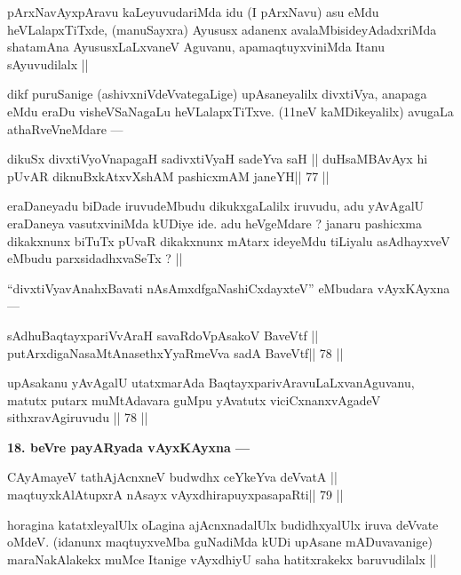 \begin{artha}
pArxNavAyxpAravu kaLeyuvudariMda idu (I pArxNavu) asu eMdu heVLalapxTiTxde, (manuSayxra) Ayususx adanenx avalaMbisideyAdadxriMda shatamAna AyususxLaLxvaneV Aguvanu, apamaqtuyxviniMda Itanu sAyuvudilalx ||
\end{artha}

\begin{artha}
dikf puruSanige (ashivxniVdeVvategaLige) upAsaneyalilx divxtiVya, anapaga eMdu eraDu visheVSaNagaLu heVLalapxTiTxve. (11neV kaMDikeyalilx) avugaLa athaRveVneMdare ---
\end{artha}

\begin{shl}
dikuSx divxtiVyoV\s napagaH sadivxtiVyaH sadeYva saH ||
duHsaMBAvAyx hi pUvAR diknuBxkAtxvX\s\s shAM pashicxmAM janeYH\hfill || 77 ||
\end{shl}

\begin{artha}
eraDaneyadu biDade iruvudeMbudu dikukxgaLalilx iruvudu, adu yAvAgalU eraDaneya vasutxviniMda kUDiye ide. adu heVgeMdare ? janaru pashicxma dikakxnunx biTuTx pUvaR dikakxnunx mAtarx ideyeMdu tiLiyalu asAdhayxveV eMbudu parxsidadhxvaSeTx ? ||
\end{artha}

\begin{artha}
``divxtiVyavAnahxBavati nAsAmxdfgaNashiCxdayxteV'' eMbudara vAyxKAyxna ---
\end{artha} 

\begin{shl}
sAdhuBaqtayxpariVvAraH savaRdoVpAsakoV BaveVtf ||
putArxdigaNasaMtAnasethxYyaRmeVva sadA BaveVtf\hfill || 78 ||
\end{shl}

\begin{artha}
upAsakanu yAvAgalU utatxmarAda BaqtayxparivAravuLaLxvanAguvanu, matutx putarx muMtAdavara guMpu yAvatutx viciCxnanxvAgadeV sithxravAgiruvudu || 78 ||
\end{artha} 

\begin{artha}
{\bf 18. beVre payARyada vAyxKAyxna ---}
\end{artha} 

\begin{shl}
CAyAmayeV tathA\s jAcnxneV budwdhx ceYkeYva deVvatA ||
maqtuyxkAlAtupxrA nAsayx vAyxdhirapuyxpasapaRti\hfill || 79 ||
\end{shl}

\begin{artha}
horagina katatxleyalUlx oLagina ajAcnxnadalUlx budidhxyalUlx iruva 
deVvate oMdeV. (idanunx maqtuyxveMba guNadiMda kUDi upAsane mADuvavanige) maraNakAlakekx muMce Itanige vAyxdhiyU saha hatitxrakekx baruvudilalx ||
\end{artha}

